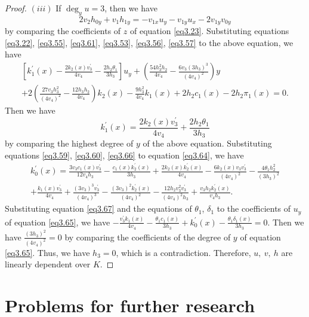 \documentclass[12pt, twoside, leqno]{article}
\theoremstyle{definition}
\numberwithin{equation}{section}
\begin{document}
\begin{proof}
$(iii)$  If $\deg_yu=3$, then we have
$$2v_2h_{0y}+v_1h_{1y}=-v_{1x}u_y-v_{1y}u_x-2v_{1y}v_{0y}$$
by comparing the coefficients of $z$ of equation \eqref{eq3.23}. Substituting equations \eqref{eq3.22}, \eqref{eq3.55}, \eqref{eq3.61}, \eqref{eq3.53}, \eqref{eq3.56}, \eqref{eq3.57} to the above equation, we have
\begin{equation}\nonumber
\begin{split}
\left[k_1^{'}(x)-\frac{2k_2(x)v_3^{'}}{4v_4}-\frac{2h_2\theta_1}{3h_3}\right]u_y+\left(\frac{54h_3^2h_2}{4v_4}-\frac{6v_3(3h_3)^3}{(4v_4)^2}\right)y\\
+2\left(\frac{27v_3h_3^2}{(4v_4)^2}-\frac{12h_3h_2}{4v_4}\right)k_2(x)-\frac{9h_3^2}{4v_4}k_1(x)+2h_2c_1(x)-2h_2\pi_1(x)=0.
\end{split}
\end{equation}
Then we have
\begin{equation}\label{eq3.66}
k_1^{'}(x)=\frac{2k_2(x)v_3^{'}}{4v_4}+\frac{2h_2\theta_1}{3h_3}
\end{equation}
by comparing the highest degree of $y$ of the above equation. Substituting equations \eqref{eq3.59}, \eqref{eq3.60}, \eqref{eq3.66} to equation \eqref{eq3.64}, we have
\begin{equation}\label{eq3.67}
\begin{split}
k_{0}^{'}(x)=\frac{3v_{3}c_{1}(x)v_{3}^{'}}{12v_{4}h_{3}}-\frac{c_{1}(x)k_{2}^{'}(x)}{3h_{3}}+\frac{2k_{2}(x)k_{2}^{'}(x)}{4v_{4}}-\frac{6k_{2}(x)v_{3}v_{3}^{'}}{(4v_{4})^{2}}
-\frac{4\theta_{1}h_2^2}{(3h_{3})^{2}}\\+\frac{k_{1}(x)v_{3}^{'}}{4v_{4}}+\frac{(3v_{3})^3v_{3}^{'}}{(4v_{4})^{3}}
-\frac{(3v_{3})^2k_{2}^{'}(x)}{(4v_{4})^{2}}-\frac{12h_{2}v_{3}^{2}v_{3}^{'}}{(4v_{4})^{2}h_{3}}+\frac{v_{3}h_{2}k_{2}^{'}(x)}{v_{4}h_{3}}.
\end{split}
\end{equation}
Substituting equation \eqref{eq3.67} and the equations of $\theta_1$, $\delta_1$ to the coefficients of $u_y$ of equation \eqref{eq3.65}, we have $-\frac{v_3^{'}k_1(x)}{4v_4}-\frac{\theta_1c_1(x)}{3h_3}+k_0^{'}(x)-\frac{\theta_1\delta_1(x)}{3h_3}=0$.
Then we have $\frac{(3h_3)^2}{(4v_4)^2}=0$ by comparing the coefficients of the degree of $y$ of equation \eqref{eq3.65}. Thus, we have $h_3=0$, which is a contradiction. Therefore, $u,~v,~h$ are linearly dependent over $K$.
\end{proof}

\section{Problems for further research}
\end{document}
